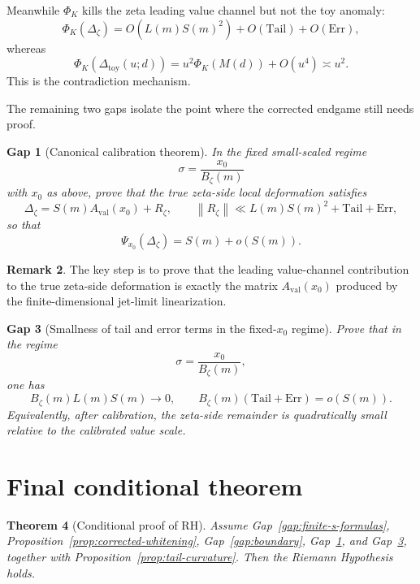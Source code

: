 \documentclass[11pt]{article}
\theoremstyle{plain}
\newtheorem{theorem}{Theorem}[section]
\newtheorem{gaptheorem}[theorem]{Gap}
\theoremstyle{definition}
\newtheorem{remark}[theorem]{Remark}
\newcommand{\RH}{\mathrm{RH}}
\newcommand{\Psical}{\Psi}
\newcommand{\toy}{\mathrm{toy}}
\newcommand{\val}{\mathrm{val}}
\newcommand{\Err}{\mathrm{Err}}
\newcommand{\Tail}{\mathrm{Tail}}
\newcommand{\Aval}{A_{\val}}
\newcommand{\norm}[1]{\left\lVert #1\right\rVert}
\begin{document}
Meanwhile $\Phi_K$ kills the zeta leading value channel but not the toy anomaly:
\[
\Phi_K(\Delta_\zeta)=O(L(m)S(m)^2)+O(\Tail)+O(\Err),
\]
whereas
\[
\Phi_K(\Delta_\toy(u;d))=u^2\Phi_K(M(d))+O(u^4)\asymp u^2.
\]
This is the contradiction mechanism.

The remaining two gaps isolate the point where the corrected endgame still needs proof.

\begin{gaptheorem}[Canonical calibration theorem]
\label{gap:value-calibration}
In the fixed small-scaled regime
\[
\sigma=\frac{x_0}{B_\zeta(m)}
\]
with $x_0$ as above, prove that the true zeta-side local deformation satisfies
\[
\Delta_\zeta = S(m)\Aval(x_0)+R_\zeta,
\qquad
\norm{R_\zeta}\ll L(m)S(m)^2+\Tail+\Err,
\]
so that
\[
\Psical_{x_0}(\Delta_\zeta)=S(m)+o(S(m)).
\]
\end{gaptheorem}

\begin{remark}
The key step is to prove that the leading value-channel contribution to the true zeta-side deformation is exactly the matrix $\Aval(x_0)$ produced by the finite-dimensional jet-limit linearization.
\end{remark}

\begin{gaptheorem}[Smallness of tail and error terms in the fixed-$x_0$ regime]
\label{gap:smallness-regime}
Prove that in the regime
\[
\sigma=\frac{x_0}{B_\zeta(m)},
\]
one has
\[
B_\zeta(m)L(m)S(m)\to 0,
\qquad
B_\zeta(m)(\Tail+\Err)=o(S(m)).
\]
Equivalently, after calibration, the zeta-side remainder is quadratically small relative to the calibrated value scale.
\end{gaptheorem}

\section{Final conditional theorem}

\begin{theorem}[Conditional proof of $\RH$]
Assume Gap~\ref{gap:finite-s-formulas}, Proposition~\ref{prop:corrected-whitening}, Gap~\ref{gap:boundary}, Gap~\ref{gap:value-calibration}, and Gap~\ref{gap:smallness-regime}, together with Proposition~\ref{prop:tail-curvature}. Then the Riemann Hypothesis holds.
\end{theorem}
\end{document}
